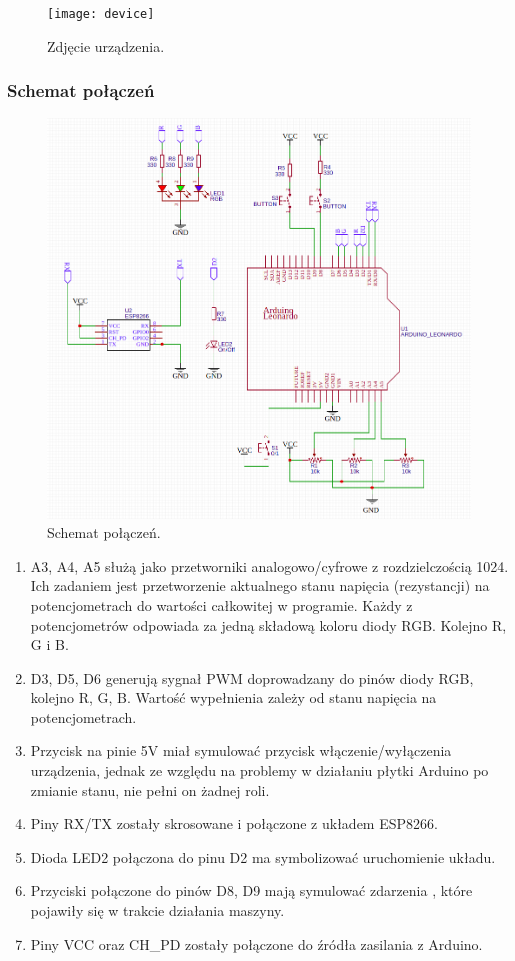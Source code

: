 \documentclass[12pt,twoside,polish]{article}
\begin{document}
\begin{figure}[h]
	\centering	
	\texttt{[image: device]}
	\caption{Zdjęcie urządzenia.}
	\label{device}
\end{figure}

\subsubsection*{Schemat połączeń}
\begin{figure}[h]
	\centering	
	\includegraphics[width=\textwidth]{scheme2}
	\caption{Schemat połączeń.}
	\label{scheme}
\end{figure}


\begin{enumerate}[label=\alph*), leftmargin=1.25cm]
	\item A3, A4, A5 służą jako przetworniki analogowo/cyfrowe z rozdzielczością 1024. Ich zadaniem jest przetworzenie aktualnego stanu napięcia (rezystancji) na potencjometrach do wartości całkowitej w programie. Każdy z potencjometrów odpowiada za jedną składową koloru diody RGB. Kolejno R, G i B.
	\item D3, D5, D6 generują sygnał PWM doprowadzany do pinów diody RGB, kolejno R, G, B. Wartość wypełnienia zależy od stanu napięcia na potencjometrach.
	\item Przycisk na pinie 5V miał symulować przycisk włączenie/wyłączenia urządzenia, jednak ze względu na problemy w działaniu płytki Arduino po zmianie stanu, nie pełni on żadnej roli.
	\item Piny RX/TX zostały skrosowane i połączone z układem ESP8266.
	\item Dioda LED2 połączona do pinu D2 ma symbolizować uruchomienie układu.
	\item Przyciski połączone do pinów D8, D9 mają symulować zdarzenia , które pojawiły się w trakcie działania maszyny.
	\item Piny VCC oraz CH\_PD zostały połączone do źródła zasilania z Arduino.
\end{enumerate}
\end{document}
